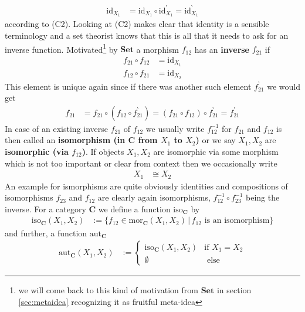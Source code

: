 \begin{align*}
  \mathrm{id}_{X_{1}}
  &=
  \mathrm{id}_{X_{1}}
  \circ
  \mathrm{id}_{X_{1}}^{\backprime}
  =
  \mathrm{id}_{X_{1}}^{\backprime}
\end{align*}
according to (C2). Looking at (C2) makes clear that identity is a sensible terminology and a set theorist knows that this is all that it needs to ask for an inverse function. Motivated\footnote{we will come back to this kind of motivation from $\mathbf{Set}$ in section \ref{sec:metaidea} recognizing it as fruitful meta-idea} by $\mathbf{Set}$ a morphism $f_{12}$ has an \textbf{inverse} $f_{21}$ if
\begin{align*}
  f_{21}
  \circ
  f_{12}
  &=
  \mathrm{id}_{X_{1}}
  \\
  f_{12}
  \circ
  f_{21}
  &=
  \mathrm{id}_{X_{2}}
\end{align*}
This element is unique again since if there was another such element $f_{21}^{\backprime}$ we would get
\begin{align*}
  f_{21}
  &=
  f_{21}
  \circ
  \left(
    f_{12}
    \circ
    f_{21}^{\backprime}
  \right)
  =
  (f_{21} \circ f_{12})
  \circ
  f_{21}^{\backprime}
  =
  f_{21}^{\backprime}
\end{align*}
In case of an existing inverse $f_{21}$ of $f_{12}$ we usually write $f_{12}^{-1}$ for $f_{21}$ and $f_{12}$ is then called an \textbf{isomorphism (in $\mathbf{C}$ from $X_{1}$ to $X_{2}$)} or we say $X_{1},X_{2}$ are \textbf{isomorphic (via $f_{12}$)}. If objects $X_{1},X_{2}$ are isomorphic via some morphism which is not too important or clear from context then we occasionally write
\begin{align*}
  X_{1}
  &\cong
  X_{2}
\end{align*}
An example for ismorphisms are quite obviously identities and compositions of isomorphisms $f_{23}$ and $f_{12}$ are clearly again isomorphisms, $f_{12}^{-1} \circ f_{23}^{-1}$ being the inverse. For a category $\mathbf{C}$ we define a function $\mathrm{iso}_{\mathbf{C}}$ by
\begin{align*}
  \mathrm{iso}_{\mathbf{C}}(X_{1},X_{2})
  &:=
  \lbrace
      f_{12}
      \in
      \mathrm{mor}_{\mathbf{C}}(X_{1},X_{2})
    \,
    \vert
    \,
      f_{12}
      \text{ is an isomorphism}
  \rbrace
\end{align*}
and further, a function $\mathrm{aut}_{\mathbf{C}}$
\begin{align*}
  \mathrm{aut}_{\mathbf{C}}(X_{1},X_{2})
  &:=
  \begin{cases}
    \mathrm{iso}_{\mathbf{C}}(X_{1},X_{2})
    &
    \text{if }
    X_{1}
    =
    X_{2}
    \\
    \emptyset
    &
    \text{ else}
  \end{cases}
\end{align*}
